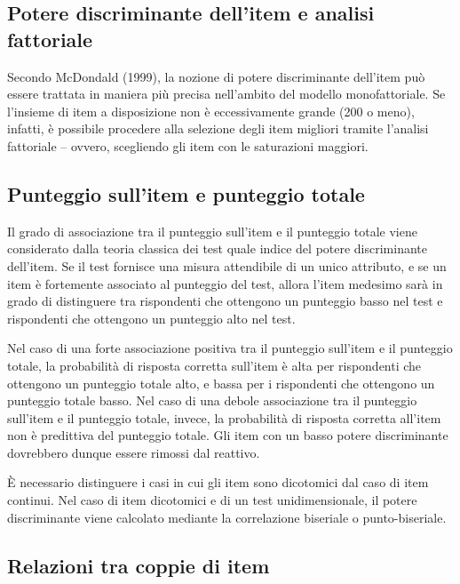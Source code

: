 \documentclass[
  11pt,
]{krantz}
\theoremstyle{definition}
\theoremstyle{definition}
\theoremstyle{definition}
\theoremstyle{definition}
\theoremstyle{remark}
\begin{document}
\hypertarget{potere-discriminante-dellitem-e-analisi-fattoriale}{%
\subsection{Potere discriminante dell'item e analisi fattoriale}\label{potere-discriminante-dellitem-e-analisi-fattoriale}}

Secondo McDondald (1999), la nozione di potere discriminante dell'item può essere trattata in maniera più precisa nell'ambito del modello monofattoriale. Se l'insieme di item a disposizione non è eccessivamente grande (200 o meno), infatti, è possibile procedere alla selezione degli item migliori tramite l'analisi fattoriale -- ovvero, scegliendo gli item con le saturazioni maggiori.

\hypertarget{punteggio-sullitem-e-punteggio-totale}{%
\subsection{Punteggio sull'item e punteggio totale}\label{punteggio-sullitem-e-punteggio-totale}}

Il grado di associazione tra il punteggio sull'item e il punteggio totale viene considerato dalla teoria classica dei test quale indice del potere discriminante dell'item. Se il test fornisce una misura attendibile di un unico attributo, e se un item è fortemente associato al punteggio del test, allora l'item medesimo sarà in grado di distinguere tra rispondenti che ottengono un punteggio basso nel test e rispondenti che ottengono un punteggio alto nel test.

Nel caso di una forte associazione positiva tra il punteggio sull'item e il punteggio totale, la probabilità di risposta corretta sull'item è alta per rispondenti che ottengono un punteggio totale alto, e bassa per i rispondenti che ottengono un punteggio totale basso. Nel caso di una debole associazione tra il punteggio sull'item e il punteggio totale, invece, la probabilità di risposta corretta all'item non è predittiva del punteggio totale. Gli item con un basso potere discriminante dovrebbero dunque essere rimossi dal reattivo.

È necessario distinguere i casi in cui gli item sono dicotomici dal caso di item continui. Nel caso di item dicotomici e di un test unidimensionale, il potere discriminante viene calcolato mediante la correlazione biseriale o punto-biseriale.

\hypertarget{relazioni-tra-coppie-di-item}{%
\subsection{Relazioni tra coppie di item}\label{relazioni-tra-coppie-di-item}}
\end{document}
